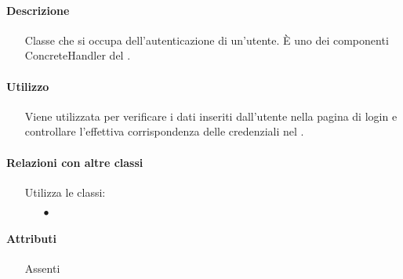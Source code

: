 \paragraph*{Descrizione}
\begin{itemize}
\item[] Classe che si occupa dell'autenticazione di un'utente. È uno dei componenti ConcreteHandler del  .
\end{itemize}

\paragraph*{Utilizzo}
\begin{itemize}
\item[] Viene utilizzata per verificare i dati inseriti dall'utente nella pagina di login e controllare l'effettiva corrispondenza delle credenziali nel .
\end{itemize}

\paragraph*{Relazioni con altre classi}
\begin{itemize}


\item[] Utilizza le classi:
\begin{itemize}
\item[$\bullet$] 
\end{itemize}
\end{itemize}

\paragraph*{Attributi}
\begin{itemize}
\item[] Assenti
\end{itemize}

